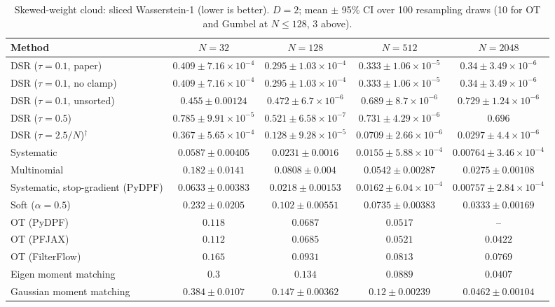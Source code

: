 \begin{table}[H]
\centering
\small
\caption{Skewed-weight cloud: sliced Wasserstein-1 (lower is better). $D{=}2$; mean $\pm$ 95\% CI over 100 resampling draws (10 for OT and Gumbel at $N\le128$, 3 above).}
\label{tab:static-skewed-sliced_w1}
\begin{adjustbox}{max width=\linewidth}
\begin{tabular}{lcccc}
\toprule
Method & $N{=}32$ & $N{=}128$ & $N{=}512$ & $N{=}2048$ \\
\midrule
DSR ($\tau{=}0.1$, paper) & $0.409\pm7.16\times10^{-4}$ & $0.295\pm1.03\times10^{-4}$ & $0.333\pm1.06\times10^{-5}$ & $0.34\pm3.49\times10^{-6}$ \\
DSR ($\tau{=}0.1$, no clamp) & $0.409\pm7.16\times10^{-4}$ & $0.295\pm1.03\times10^{-4}$ & $0.333\pm1.06\times10^{-5}$ & $0.34\pm3.49\times10^{-6}$ \\
DSR ($\tau{=}0.1$, unsorted) & $0.455\pm0.00124$ & $0.472\pm6.7\times10^{-6}$ & $0.689\pm8.7\times10^{-6}$ & $0.729\pm1.24\times10^{-6}$ \\
DSR ($\tau{=}0.5$) & $0.785\pm9.91\times10^{-5}$ & $0.521\pm6.58\times10^{-7}$ & $0.731\pm4.29\times10^{-6}$ & $0.696$ \\
DSR ($\tau{=}2.5/N$)$^\dagger$ & $0.367\pm5.65\times10^{-4}$ & $0.128\pm9.28\times10^{-5}$ & $0.0709\pm2.66\times10^{-6}$ & $0.0297\pm4.4\times10^{-6}$ \\
\midrule
Systematic & $0.0587\pm0.00405$ & $0.0231\pm0.0016$ & $0.0155\pm5.88\times10^{-4}$ & $0.00764\pm3.46\times10^{-4}$ \\
Multinomial & $0.182\pm0.0141$ & $0.0808\pm0.004$ & $0.0542\pm0.00287$ & $0.0275\pm0.00108$ \\
Systematic, stop-gradient (PyDPF) & $0.0633\pm0.00383$ & $\mathbf{0.0218\pm0.00153}$ & $0.0162\pm6.04\times10^{-4}$ & $0.00757\pm2.84\times10^{-4}$ \\
Soft ($\alpha{=}0.5$) & $0.232\pm0.0205$ & $0.102\pm0.00551$ & $0.0735\pm0.00383$ & $0.0333\pm0.00169$ \\
OT (PyDPF) & $0.118$ & $0.0687$ & $0.0517$ & -- \\
OT (PFJAX) & $0.112$ & $0.0685$ & $0.0521$ & $0.0422$ \\
OT (FilterFlow) & $0.165$ & $0.0931$ & $0.0813$ & $0.0769$ \\
Eigen moment matching & $0.3$ & $0.134$ & $0.0889$ & $0.0407$ \\
Gaussian moment matching & $0.384\pm0.0107$ & $0.147\pm0.00362$ & $0.12\pm0.00239$ & $0.0462\pm0.00104$ \\

\end{tabular}
\end{adjustbox}
\end{table}
